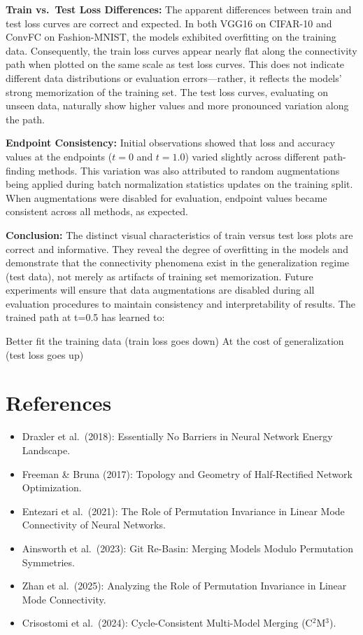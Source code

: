 \documentclass[11pt,a4paper]{article}
\begin{document}
\textbf{Train vs.\ Test Loss Differences:} The apparent differences between train and test loss curves are correct and expected. In both VGG16 on CIFAR-10 and ConvFC on Fashion-MNIST, the models exhibited overfitting on the training data. Consequently, the train loss curves appear nearly flat along the connectivity path when plotted on the same scale as test loss curves. This does not indicate different data distributions or evaluation errors---rather, it reflects the models' strong memorization of the training set. The test loss curves, evaluating on unseen data, naturally show higher values and more pronounced variation along the path.

\textbf{Endpoint Consistency:} Initial observations showed that loss and accuracy values at the endpoints ($t=0$ and $t=1.0$) varied slightly across different path-finding methods. This variation was also attributed to random augmentations being applied during batch normalization statistics updates on the training split. When augmentations were disabled for evaluation, endpoint values became consistent across all methods, as expected.

\textbf{Conclusion:} The distinct visual characteristics of train versus test loss plots are correct and informative. They reveal the degree of overfitting in the models and demonstrate that the connectivity phenomena exist in the generalization regime (test data), not merely as artifacts of training set memorization. Future experiments will ensure that data augmentations are disabled during all evaluation procedures to maintain consistency and interpretability of results.
The trained path at t=0.5 has learned to:

Better fit the training data (train loss goes down)
At the cost of generalization (test loss goes up)




\section{References}
\begin{itemize}
    \item Draxler et al.\ (2018): Essentially No Barriers in Neural Network Energy Landscape.
    \item Freeman \& Bruna (2017): Topology and Geometry of Half-Rectified Network Optimization.
    \item Entezari et al.\ (2021): The Role of Permutation Invariance in Linear Mode Connectivity of Neural Networks.
    \item Ainsworth et al.\ (2023): Git Re-Basin: Merging Models Modulo Permutation Symmetries.
    \item Zhan et al.\ (2025): Analyzing the Role of Permutation Invariance in Linear Mode Connectivity.
    \item Crisostomi et al.\ (2024): Cycle-Consistent Multi-Model Merging (C$^2$M$^3$).
\end{itemize}
\end{document}
